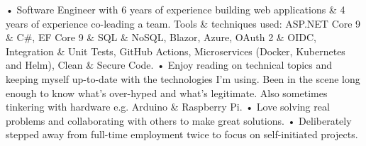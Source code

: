 

\begin{cvparagraph}

• Software Engineer with 6 years of experience building web applications \& 4 years of experience co-leading a team. Tools \& techniques used: ASP.NET Core 9 \& C\#, EF Core 9 \& SQL \& NoSQL, Blazor, Azure, OAuth 2 \& OIDC, Integration \& Unit Tests, GitHub Actions, Microservices (Docker, Kubernetes and Helm), Clean \& Secure Code.
\newline
• Enjoy reading on technical topics and keeping myself up-to-date with the technologies I'm using. Been in the scene long enough to know what's over-hyped and what's legitimate. Also sometimes tinkering with hardware e.g. Arduino \& Raspberry Pi.
\newline
• Love solving real problems and collaborating with others to make great solutions.
\newline
• Deliberately stepped away from full-time employment twice to focus on self-initiated projects.
\end{cvparagraph}
